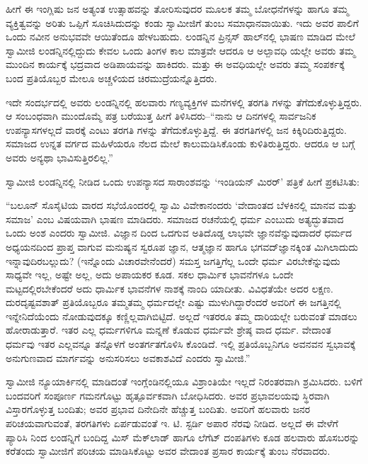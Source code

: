 ಹೀಗೆ ಈ ಇಂಗ್ಲಿಷು ಜನ ಅತ್ಯಂತ ಉತ್ಸಾಹವನ್ನು ತೋರಿಸುವುದರ ಮೂಲಕ ತಮ್ಮ ಬೋಧನೆಗಳನ್ನು ಹಾಗೂ ತಮ್ಮ ವ್ಯಕ್ತಿತ್ವವನ್ನು ಅರಿತು ಒಪ್ಪಿಗೆ ಸೂಚಿಸಿದುದನ್ನು ಕಂಡು ಸ್ವಾಮೀಜಿಗೆ ತುಂಬ ಸಮಾಧಾನವಾಯಿತು. ಇದು ಅವರ ಪಾಲಿಗೆ ಒಂದು ನವೀನ ಅನುಭವವೇ ಆಯಿತೆಂದೂ ಹೇಳಬಹುದು. ಲಂಡನ್ನಿನ ಪ್ರಿನ್ಸಸ್ ಹಾಲ್​ನಲ್ಲಿ ಭಾಷಣ ಮಾಡಿದ ಮೇಲೆ ಸ್ವಾಮೀಜಿ ಲಂಡನ್ನಿನಲ್ಲಿದ್ದುದು ಕೇವಲ ಒಂದು ತಿಂಗಳ ಕಾಲ ಮಾತ್ರವೇ ಆದರೂ ಆ ಅಲ್ಪಾವಧಿ ಯಲ್ಲೇ ಅವರು ತಮ್ಮ ಮುಂದಿನ ಕಾರ್ಯಕ್ಕೆ ಭದ್ರವಾದ ಅಡಿಪಾಯವನ್ನು ಹಾಕಿದರು. ಮತ್ತು ಈ ಅವಧಿಯಲ್ಲೇ ಅವರು ತಮ್ಮ ಸಂಪರ್ಕಕ್ಕೆ ಬಂದ ಪ್ರತಿಯೊಬ್ಬರ ಮೇಲೂ ಅಚ್ಚಳಿಯದ ಚಿರಮುದ್ರೆಯನ್ನೊತ್ತಿದರು.

ಇದೇ ಸಂದರ್ಭದಲ್ಲಿ ಅವರು ಲಂಡನ್ನಿನಲ್ಲಿ ಹಲವಾರು ಗಣ್ಯವ್ಯಕ್ತಿಗಳ ಮನೆಗಳಲ್ಲಿ ತರಗತಿ ಗಳನ್ನು ತೆಗೆದುಕೊಳ್ಳುತ್ತಿದ್ದರು. ಆ ಸಂಬಂಧವಾಗಿ ಮುಂದೊಮ್ಮೆ ಪತ್ರ ಬರೆಯುತ್ತ ಹೀಗೆ ತಿಳಿಸಿದರು–“ನಾನು ಆ ದಿನಗಳಲ್ಲಿ ಸಾರ್ವಜನಿಕ ಉಪನ್ಯಾಸಗಳಲ್ಲದೆ ವಾರಕ್ಕೆ ಎಂಟು ತರಗತಿ ಗಳನ್ನು ತೆಗೆದುಕೊಳ್ಳುತ್ತಿದ್ದೆ. ಈ ತರಗತಿಗಳಲ್ಲಿ ಜನ ಕಿಕ್ಕಿರಿದಿರುತ್ತಿದ್ದರು. ಸಮಾಜದ ಉನ್ನತ ವರ್ಗದ ಮಹಿಳೆಯರೂ ನೆಲದ ಮೇಲೆ ಕಾಲುಮಡಿಸಿಕೊಂಡು ಕುಳಿತಿರುತ್ತಿದ್ದರು. ಆದರೂ ಆ ಬಗ್ಗೆ ಅವರು ಅನ್ಯಥಾ ಭಾವಿಸುತ್ತಿರಲಿಲ್ಲ.”

ಸ್ವಾಮೀಜಿ ಲಂಡನ್ನಿನಲ್ಲಿ ನೀಡಿದ ಒಂದು ಉಪನ್ಯಾಸದ ಸಾರಾಂಶವನ್ನು ‘ಇಂಡಿಯನ್ ಮಿರರ್​’ ಪತ್ರಿಕೆ ಹೀಗೆ ಪ್ರಕಟಿಸಿತು:

“ಬಲೂನ್ ಸೊಸೈಟಿಯ ವಾರದ ಸಭೆಯೊಂದರಲ್ಲಿ ಸ್ವಾಮಿ ವಿವೇಕಾನಂದರು ‘ವೇದಾಂತದ ಬೆಳಕಿನಲ್ಲಿ ಮಾನವ ಮತ್ತು ಸಮಾಜ’ ಎಂಬ ವಿಷಯವಾಗಿ ಭಾಷಣ ಮಾಡಿದರು. ಸಮಾಜದ ರಚನೆಯಲ್ಲಿ ಧರ್ಮ ಎಂಬುದು ಅತ್ಯದ್ಭುತವಾದ ಒಂದು ಅಂಶ ಎಂದರು ಸ್ವಾಮೀಜಿ. ವಿಜ್ಞಾನ ದಿಂದ ಒದಗುವ ಅತಿದೊಡ್ಡ ಲಾಭವೇ ಜ್ಞಾನವೆನ್ನುವುದಾದರೆ ಧರ್ಮದ ಅಧ್ಯಯನದಿಂದ ಪ್ರಾಪ್ತ ವಾಗುವ ಮನುಷ್ಯನ ಸ್ವರೂಪ ಜ್ಞಾನ, ಆತ್ಮಜ್ಞಾನ ಹಾಗೂ ಭಗವದ್​ಜ್ಞಾನಕ್ಕಿಂತ ಮಿಗಿಲಾದುದು ಇನ್ನಾವುದಿರಬಲ್ಲುದು? (ಇನ್ನೊಂದು ವಿಚಾರವೇನೆಂದರೆ) ಸಮಸ್ತ ಜಗತ್ತಿಗೆಲ್ಲ ಒಂದೇ ಧರ್ಮ ವಿರಬೇಕೆನ್ನುವುದು ಸಾಧ್ಯವೇ ಇಲ್ಲ, ಅಷ್ಟೇ ಅಲ್ಲ, ಅದು ಅಪಾಯಕರ ಕೂಡ. ಸಕಲ ಧಾರ್ಮಿಕ ಭಾವನೆಗಳೂ ಒಂದೇ ಮಟ್ಟದಲ್ಲಿರಬೇಕೆಂದರೆ ಅದು ಧಾರ್ಮಿಕ ಭಾವನೆಗಳ ನಾಶಕ್ಕೆ ನಾಂದಿ ಯಾದೀತು. ವಿವಿಧತೆಯೇ ಅದರ ಲಕ್ಷಣ. ದುರದೃಷ್ಟವಶಾತ್ ಪ್ರತಿಯೊಬ್ಬರೂ ತಮ್ಮತಮ್ಮ ಧರ್ಮದಲ್ಲೇ ಎಷ್ಟು ಮುಳುಗಿದ್ದಾರೆಂದರೆ ಅವರಿಗೆ ಈ ಜಗತ್ತಿನಲ್ಲಿ ಇನ್ನೇನಿದೆಯೆಂದು ನೋಡುವುದಕ್ಕೂ ಕಣ್ಣಿಲ್ಲವಾಗಿಬಿಟ್ಟಿದೆ. ಅಲ್ಲದೆ ಇತರರೂ ತಮ್ಮ ದಾರಿಯಲ್ಲೇ ಬರುವಂತೆ ಮಾಡಲು ಹೋರಾಡುತ್ತಾರೆ. ಇತರ ಎಲ್ಲ ಧರ್ಮಗಳಿಗೂ ಮನ್ನಣೆ ಕೊಡುವ ಧರ್ಮವೇ ಶ್ರೇಷ್ಠ ವಾದ ಧರ್ಮ. ವೇದಾಂತ ಧರ್ಮವು ಇತರ ಎಲ್ಲವನ್ನೂ ತನ್ನೊಳಗೆ ಅಂತರ್ಗತಗೊಳಿಸಿ ಕೊಂಡಿದೆ. ಇಲ್ಲಿ ಪ್ರತಿಯೊಬ್ಬನಿಗೂ ಅವನವನ ಸ್ವಭಾವಕ್ಕೆ ಅನುಗುಣವಾದ ಮಾರ್ಗವನ್ನು ಅನುಸರಿಸಲು ಅವಕಾಶವಿದೆ ಎಂದರು ಸ್ವಾಮೀಜಿ.”

ಸ್ವಾಮೀಜಿ ನ್ಯೂಯಾರ್ಕಿನಲ್ಲಿ ಮಾಡಿದಂತೆ ಇಂಗ್ಲೆಂಡಿನಲ್ಲಿಯೂ ವಿಶ್ರಾಂತಿಯೇ ಇಲ್ಲದೆ ನಿರಂತರವಾಗಿ ಶ್ರಮಿಸಿದರು. ಬಳಿಗೆ ಬಂದವರಿಗೆ ಸಂಪೂರ್ಣ ಗಮನಗೊಟ್ಟು ಹೃತ್ಪೂರ್ವಕವಾಗಿ ಬೋಧಿಸಿದರು. ಅವರ ಪ್ರಭಾವಲಯವು ಸ್ಥಿರವಾಗಿ ವಿಸ್ತಾರಗೊಳ್ಳುತ್ತ ಬಂದಿತು; ಅವರ ಪ್ರಭಾವ ದಿನೇದಿನೇ ಹೆಚ್ಚುತ್ತ ಬಂದಿತು. ಅವರಿಗೆ ಹಲವಾರು ಜನರ ಪರಿಚಯವಾಗುವಂತೆ, ತರಗತಿಗಳು ಏರ್ಪಡುವಂತೆ ಇ. ಟಿ. ಸ್ಟರ್ಡಿ ಅಪಾರ ನೆರವು ನೀಡಿದ. ಅಲ್ಲದೆ ಈ ವೇಳೆಗೆ ಪ್ಯಾರಿಸಿ ನಿಂದ ಲಂಡನ್ನಿಗೆ ಬಂದಿದ್ದ ಮಿಸ್ ಮೆಕ್​ಲಾಡ್ ಹಾಗೂ ಲೆಗೆಟ್ ದಂಪತಿಗಳು ಕೂಡ ಹಲವಾರು ಹೊಸಬರನ್ನು ಕರೆತಂದು ಸ್ವಾಮೀಜಿಗೆ ಪರಿಚಯ ಮಾಡಿಸಿಕೊಟ್ಟು ಅವರ ವೇದಾಂತ ಪ್ರಸಾರ ಕಾರ್ಯಕ್ಕೆ ತುಂಬ ನೆರವಾದರು.

